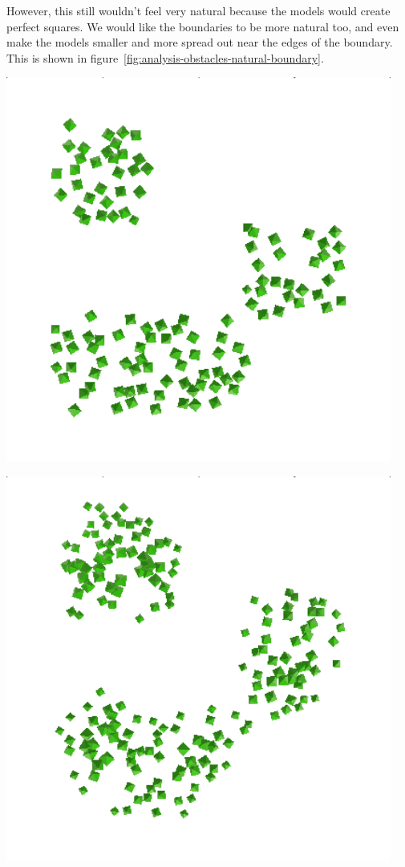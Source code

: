 However, this still wouldn't feel very natural because the models would create perfect squares.
We would like the boundaries to be more natural too, and even make the models smaller and more spread out near the edges of the boundary.
This is shown in figure~\ref{fig:analysis-obstacles-natural-boundary}.

\begin{center}
    \captionsetup{type=figure}
    \begin{minipage}{.5\textwidth}
        \centering
        \includegraphics[width=0.95\textwidth]{img/inorganic minerals.png}
    \end{minipage}%
    \begin{minipage}{.5\textwidth}
        \centering
        \includegraphics[width=0.95\textwidth]{img/organic minerals.png}

\end{minipage}
\end{center}
